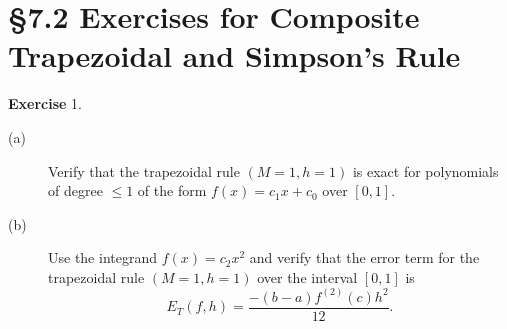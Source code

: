 \documentclass[UTF8,12pt,hyperref]{ctexart}
\makeatletter
\newenvironment{exercise}[1][{\color{blue}\bf Exercise}]%
{%
 \begin{center}   \begin{lrbox}{\@tempboxa}%
    \begin{minipage}{\textwidth}%
  {\color{blue}\bfseries
#1}   }{%
    \end{minipage}%
    \end{lrbox}
    \colorbox{green}{\noindent\usebox{\@tempboxa}} \end{center}  
}
\makeatother
\begin{document}
 \vspace{0.38cm}

 \section*{\S  7.2  Exercises for Composite Trapezoidal and Simpson's Rule}
  
\begin{exercise}1.    \quad %
\begin{description}
\item[(a)] Verify that the trapezoidal rule $(M =1, h = 1)$ is exact for polynomials of degree $\leqslant 1$ of the form $f(x) =c_1x +c_0$ over $[0, 1]$. 

\item[(b)] Use the integrand $f(x) =c_2x^2$ and verify that the error term for the trapezoidal rule $(M =1, h =1)$ over the interval $[0, 1]$ is
$$
E_T(f, h)=\dfrac{-(b-a)f^{(2)}(c)h^2}{12}. 
$$
\end{description}  
 \end{exercise} 
 
\end{document}
